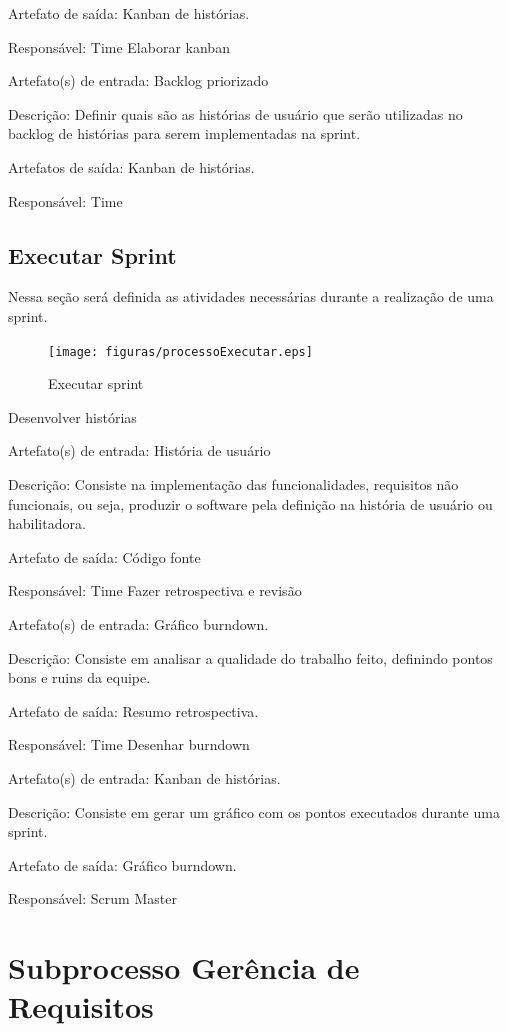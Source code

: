 Artefato de saída: Kanban de histórias.

Responsável: Time
Elaborar kanban

Artefato(s) de entrada: Backlog priorizado

Descrição: Definir quais são as histórias de usuário que serão utilizadas no backlog de histórias para serem implementadas na sprint.

Artefatos de saída: Kanban de histórias.

Responsável: Time

\subsection{Executar Sprint}

Nessa seção será definida as atividades necessárias durante a realização de uma sprint.

\begin{figure}[H]
    \centering
    \caption{Executar sprint}
    \label{processoExecutar}
    \texttt{[image: figuras/processoExecutar.eps]}
\end{figure}

Desenvolver histórias

Artefato(s) de entrada: História de usuário

Descrição: Consiste na implementação das funcionalidades, requisitos não funcionais, ou seja, produzir o software pela definição na história de usuário ou habilitadora.

Artefato de saída: Código fonte

Responsável: Time
Fazer retrospectiva e revisão

Artefato(s) de entrada: Gráfico burndown.

Descrição: Consiste em analisar a qualidade do trabalho feito, definindo pontos bons e ruins da equipe.

Artefato de saída: Resumo retrospectiva.

Responsável: Time
Desenhar burndown

Artefato(s) de entrada: Kanban de histórias.

Descrição: Consiste em gerar um gráfico com os pontos executados durante uma sprint.

Artefato de saída: Gráfico burndown.

Responsável: Scrum Master


\section{Subprocesso Gerência de Requisitos}

